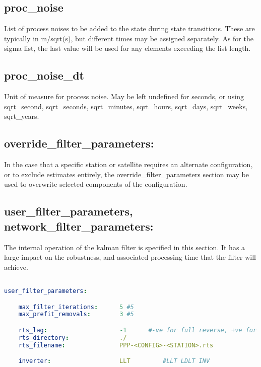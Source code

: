 \subsection*{proc\_noise}

List of process noises to be added to the state during state transitions. These are typically in m/sqrt(s), but different times may be assigned separately.
As for the sigma list, the last value will be used for any elements exceeding the list length.

\subsection*{proc\_noise\_dt}

Unit of measure for process noise. 
May be left undefined for seconds, or using sqrt\_second, sqrt\_seconds, sqrt\_minutes, sqrt\_hours, sqrt\_days, sqrt\_weeks, sqrt\_years.

\subsection{override\_filter\_parameters:}

In the case that a specific station or satellite requires an alternate configuration, or to exclude estimates entirely, the override\_filter\_parameters section may be used to overwrite selected components of the configuration.


\subsection{user\_filter\_parameters, network\_filter\_parameters:}

The internal operation of the kalman filter is specified in this section. It has a large impact on the robustness, and associated processing time that the filter will achieve.

\begin{lstlisting}[language=yaml,caption=Filter Operating Parameters:]

user_filter_parameters:

    max_filter_iterations:      5 #5
    max_prefit_removals:        3 #5

    rts_lag:                    -1      #-ve for full reverse, +ve for limited epochs
    rts_directory:              ./
    rts_filename:               PPP-<CONFIG>-<STATION>.rts

    inverter:                   LLT         #LLT LDLT INV

\end{lstlisting}


